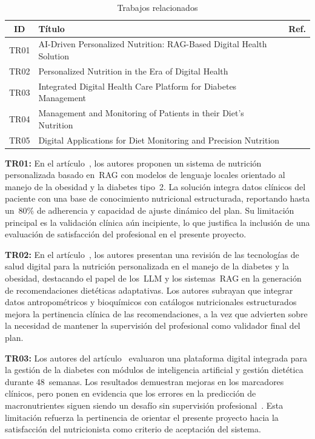 \begin{table}[ht]
\centering
\caption{Trabajos relacionados}
\label{tab:trabajos_relacionados}
\begin{tabular}{|c|p{9cm}|c|}
\hline
\textbf{ID} & \textbf{Título} & \textbf{Ref.} \\
\hline
TR01 & AI-Driven Personalized Nutrition: RAG-Based Digital Health Solution & \cite{gavai2025} \\
\hline
TR02 & Personalized Nutrition in the Era of Digital Health & \cite{arshad2025} \\
\hline
TR03 & Integrated Digital Health Care Platform for Diabetes Management & \cite{lee2023} \\
\hline
TR04 & Management and Monitoring of Patients in their Diet's Nutrition & \cite{quichimbo2021} \\
\hline
TR05 & Digital Applications for Diet Monitoring and Precision Nutrition & \cite{abeltino2025} \\
\hline
\end{tabular}
\end{table}

\textbf{TR01:} En el artículo~\cite{gavai2025}, los autores proponen un sistema de
nutrición personalizada basado en~RAG con modelos de lenguaje locales
orientado al manejo de la obesidad y la diabetes tipo~2. La solución
integra datos clínicos del paciente con una base de conocimiento
nutricional estructurada, reportando hasta un~80\% de adherencia y
capacidad de ajuste dinámico del plan. Su limitación principal es la
validación clínica aún incipiente, lo que justifica la inclusión de una
evaluación de satisfacción del profesional en el presente proyecto.

\medskip

\textbf{TR02:} En el artículo~\cite{arshad2025}, los autores presentan una revisión
de las tecnologías de salud digital para la nutrición personalizada en el
manejo de la diabetes y la obesidad, destacando el papel de los~LLM y los
sistemas~RAG en la generación de recomendaciones dietéticas adaptativas.
Los autores subrayan que integrar datos antropométricos y bioquímicos con
catálogos nutricionales estructurados mejora la pertinencia clínica de las
recomendaciones, a la vez que advierten sobre la necesidad de mantener la
supervisión del profesional como validador final del plan.

\medskip

\textbf{TR03:} Los autores del artículo~\cite{lee2023} evaluaron una plataforma
digital integrada para la gestión de la diabetes con módulos de
inteligencia artificial y gestión dietética durante 48~semanas. Los
resultados demuestran mejoras en los marcadores clínicos, pero ponen en
evidencia que los errores en la predicción de macronutrientes siguen siendo
un desafío sin supervisión profesional~\cite{mortazavi2023}. Esta
limitación refuerza la pertinencia de orientar el presente proyecto hacia
la satisfacción del nutricionista como criterio de aceptación del sistema.

